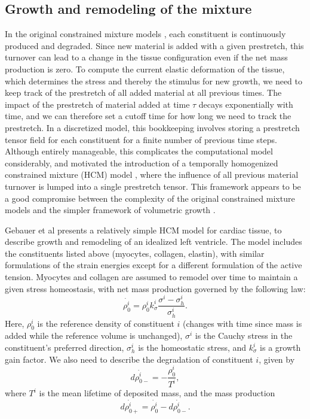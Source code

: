 \documentclass[twoside,12pt,a4paper]{article}
\begin{document}
\subsection{Growth and remodeling of the mixture}
In the original constrained mixture models \cite{humphrey2002constrained}, each constituent is continuously produced and 
degraded. Since new material is added with a given prestretch, this turnover can lead to a change in the tissue configuration
even if the net mass production is zero. To compute the current elastic deformation of the tissue, which determines the stress 
and thereby the stimulus for new growth, we need to keep track of the prestretch of all added material at all previous times. 
The impact of the prestretch of material added at time $\tau$ decays exponentially with time, and we can therefore set a cutoff
time for how long we need to track the prestretch. In a discretized model, this bookkeeping involves 
storing a prestretch tensor field for each constituent for a finite number of previous time steps. Although entirely manageable, 
this complicates the computational model considerably, and motivated the introduction of a temporally homogenized 
constrained mixture (HCM) model \cite{cyron2016homogenized}, where the influence of all previous material turnover is lumped into a single
prestretch tensor. This framework appears to be a good compromise between the complexity of the original constrained mixture
models and the simpler framework of volumetric growth \cite{rodriguez1994stress}.

Gebauer et al \cite{gebauer2022homogenized} presents a relatively simple HCM model for cardiac tissue, to describe growth and remodeling of an 
idealized left ventricle. The model includes the constituents listed above (myocytes, collagen, elastin), with similar
formulations of the strain energies except for a different formulation of the active tension. 
Myocytes and collagen are assumed to remodel over time to maintain a given stress homeostasis, with net mass production
governed by the following law:
\[
\dot{\rho_0^i} = \rho_0^ik_\sigma^i \frac{\sigma^i-\sigma_h^i}{\sigma_h^i} . 
\]
Here, $\rho_0^i$ is the reference density of constituent $i$ (changes with time since mass is added while the reference volume 
is unchanged), $\sigma^i$ is the Cauchy stress in the constituent's preferred direction, $\sigma_h^i$ is the homeostatic stress,
and $k_\sigma^i$ is a growth gain factor. We also need to describe the degradation of constituent $i$, given by
\[
  \dot{d\rho_{0-}^i} = -\frac{\rho_0^i}{T^i},  
\]
where $T^i$ is the mean lifetime of deposited mass, and the mass production 
\[
  \dot{d\rho_{0+}^i} = \dot{\rho_0^i} - \dot{d\rho_{0-}^i} .
\]
\end{document}
